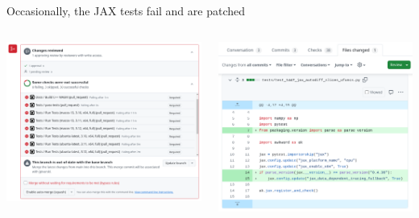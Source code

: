\documentclass[aspectratio=169]{beamer}
\begin{document}
\begin{frame}{Occasionally, the JAX tests fail and are patched}
\vspace{0.25 cm}
\begin{columns}
\includegraphics[width=\linewidth]{jax-failures.png}

\includegraphics[width=\linewidth]{jax-failures-2.png}
\end{columns}
\end{frame}
\end{document}
